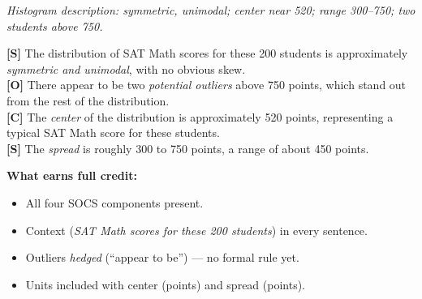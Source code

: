 \documentclass[aspectratio=169, 11pt]{beamer}
\begin{document}
{
\begin{frame}[t, plain]
  \vspace{0.8em}%
  \hspace{0.55cm}%
  \begin{minipage}{0.9\textwidth}
    \small

    \textit{Histogram description: symmetric, unimodal; center near 520;
    range 300--750; two students above 750.}

    \vspace{0.6em}

    \begin{tcolorbox}[colback=sky, colframe=navy, boxrule=0.7pt, arc=1.5mm,
        left=3mm, right=3mm, top=2mm, bottom=2mm]
    \small
    \textbf{[S]} The distribution of SAT Math scores for these 200 students
    is approximately \textit{symmetric and unimodal}, with no obvious skew.\\[4pt]
    \textbf{[O]} There appear to be two \textit{potential outliers} above 750
    points, which stand out from the rest of the distribution.\\[4pt]
    \textbf{[C]} The \textit{center} of the distribution is approximately
    520 points, representing a typical SAT Math score for these students.\\[4pt]
    \textbf{[S]} The \textit{spread} is roughly 300 to 750 points, a range
    of about 450 points.
    \end{tcolorbox}

    \vspace{0.4em}
    {\color{navy}\small\bfseries What earns full credit:}
    \begin{itemize}
      \setlength{\itemsep}{0.2em}
      \item All four SOCS components present.
      \item Context (\textit{SAT Math scores for these 200 students}) in every sentence.
      \item Outliers \textit{hedged} (``appear to be'') --- no formal rule yet.
      \item Units included with center (points) and spread (points).
    \end{itemize}
  \end{minipage}
\end{frame}
}
\end{document}
